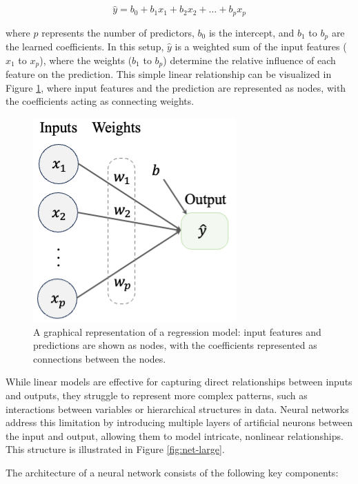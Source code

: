 \documentclass[
]{book}
\theoremstyle{definition}
\theoremstyle{definition}
\theoremstyle{definition}
\theoremstyle{definition}
\theoremstyle{remark}
\begin{document}
\[
\hat{y} = b_0 + b_1 x_1 + b_2 x_2 + \dots + b_p x_p
\]

where \(p\) represents the number of predictors, \(b_0\) is the intercept, and \(b_1\) to \(b_p\) are the learned coefficients. In this setup, \(\hat{y}\) is a weighted sum of the input features (\(x_1\) to \(x_p\)), where the weights (\(b_1\) to \(b_p\)) determine the relative influence of each feature on the prediction. This simple linear relationship can be visualized in Figure \ref{fig:net-reg}, where input features and the prediction are represented as nodes, with the coefficients acting as connecting weights.

\begin{figure}

{\centering \includegraphics[width=0.4\linewidth]{images/net_reg} 

}

\caption{A graphical representation of a regression model: input features and predictions are shown as nodes, with the coefficients represented as connections between the nodes.}\label{fig:net-reg}
\end{figure}

While linear models are effective for capturing direct relationships between inputs and outputs, they struggle to represent more complex patterns, such as interactions between variables or hierarchical structures in data. Neural networks address this limitation by introducing multiple layers of artificial neurons between the input and output, allowing them to model intricate, nonlinear relationships. This structure is illustrated in Figure \ref{fig:net-large}.

The architecture of a neural network consists of the following key components:
\end{document}
